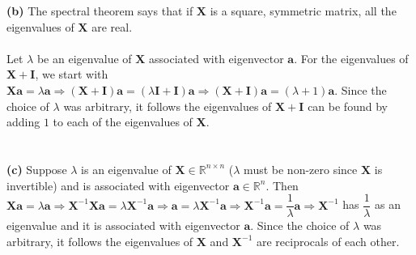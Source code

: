 \documentclass[submit]{harvardml}
\newcommand{\R}{\mathbb{R}}
\begin{document}






\textbf{(b)} The spectral theorem says that if $\mathbf{X}$ is a square, symmetric matrix, all the eigenvalues of $\mathbf{X}$ are real.\\\\
Let $\lambda$ be an eigenvalue of $\mathbf{X}$ associated with eigenvector $\mathbf{a}$. For the eigenvalues of $\mathbf{X}+\mathbf{I}$, we start with $\mathbf{Xa}=\lambda\mathbf{a}\Rightarrow(\mathbf{X}+\mathbf{I})\mathbf{a}=(\lambda \mathbf{I} + \mathbf{I})\mathbf{a}\Rightarrow(\mathbf{X}+\mathbf{I})\mathbf{a}=(\lambda+1)\mathbf{a}$. Since the choice of $\lambda$ was arbitrary, it follows the eigenvalues of $\mathbf{X}+\mathbf{I}$ can be found by adding $1$ to each of the eigenvalues of $\mathbf{X}$.\\\\\\





\textbf{(c)} Suppose $\lambda$ is an eigenvalue of $\mathbf{X} \in \R^{n \times n}$ ($\lambda$ must be non-zero since $\mathbf{X}$ is invertible) and is associated with eigenvector $\mathbf{a} \in \R^{n}$. Then $\mathbf{Xa}=\lambda \mathbf{a} \Rightarrow \mathbf{X}^{-1}\mathbf{Xa}=\lambda \mathbf{X}^{-1}\mathbf{a} \Rightarrow \mathbf{a}=\lambda \mathbf{X}^{-1}\mathbf{a} \Rightarrow \mathbf{X}^{-1}\mathbf{a}=\dfrac{1}{\lambda}\mathbf{a} \Rightarrow \mathbf{X}^{-1}$ has $\dfrac{1}{\lambda}$ as an eigenvalue and it is associated with eigenvector $\mathbf{a}$. Since the choice of $\lambda$ was arbitrary, it follows the eigenvalues of $\mathbf{X}$ and $\mathbf{X}^{-1}$ are reciprocals of each other.

\newpage
\end{document}
